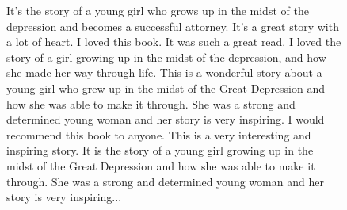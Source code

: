 \documentclass[12pt]{article}
\begin{document}
\begin{figure}[!htb]
\begin{minipage}[t]{.4\textwidth}
{It's the story of a young girl who grows up in the midst of the depression and becomes a successful attorney. It's a great story with a lot of heart.
I loved this book. It was such a great read. I loved the story of a girl growing up in the midst of the depression, and how she made her way through life.
This is a wonderful story about a young girl who grew up in the midst of the Great Depression and how she was able to make it through. She was a strong and determined young woman and her story is very inspiring. I would recommend this book to anyone.
This is a very interesting and inspiring story. It is the story of a young girl growing up in the midst of the Great Depression and how she was able to make it through. She was a strong and determined young woman and her story is very inspiring...}
\end{minipage}
\end{figure}
\pagebreak
\end{document}
